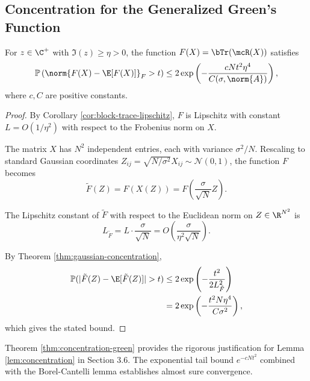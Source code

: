 \subsection{Concentration for the Generalized Green's Function}

\begin{theorem}\label{thm:concentration-green}
For $z \in \C^+$ with $\Im(z) \geq \eta > 0$, the function $F(X) = \bTr(\mcR(X))$ satisfies
\begin{equation}
\mathbb{P}\left(\norm{F(X) - \E[F(X)]}_F > t\right) \leq 2\exp\left(-\frac{cNt^2\eta^4}{C(\sigma, \norm{A})}\right),
\end{equation}
where $c, C$ are positive constants.
\end{theorem}

\begin{proof}
By Corollary \ref{cor:block-trace-lipschitz}, $F$ is Lipschitz with constant $L = O(1/\eta^2)$ with respect to the Frobenius norm on $X$.

The matrix $X$ has $N^2$ independent entries, each with variance $\sigma^2/N$. Rescaling to standard Gaussian coordinates $Z_{ij} = \sqrt{N/\sigma^2} X_{ij} \sim \mathcal{N}(0, 1)$, the function $F$ becomes
\[
\tilde{F}(Z) = F(X(Z)) = F\left(\frac{\sigma}{\sqrt{N}} Z\right).
\]

The Lipschitz constant of $\tilde{F}$ with respect to the Euclidean norm on $Z \in \R^{N^2}$ is
\[
L_{\tilde{F}} = L \cdot \frac{\sigma}{\sqrt{N}} = O\left(\frac{\sigma}{\eta^2 \sqrt{N}}\right).
\]

By Theorem \ref{thm:gaussian-concentration},
\begin{align}
\mathbb{P}(|\tilde{F}(Z) - \E[\tilde{F}(Z)]| > t)
&\leq 2\exp\left(-\frac{t^2}{2L_{\tilde{F}}^2}\right) \\
&= 2\exp\left(-\frac{t^2 N \eta^4}{C\sigma^2}\right),
\end{align}
which gives the stated bound.
\end{proof}

\begin{remark}
Theorem \ref{thm:concentration-green} provides the rigorous justification for Lemma \ref{lem:concentration} in Section 3.6. The exponential tail bound $e^{-cNt^2}$ combined with the Borel-Cantelli lemma establishes almost sure convergence.
\end{remark}

